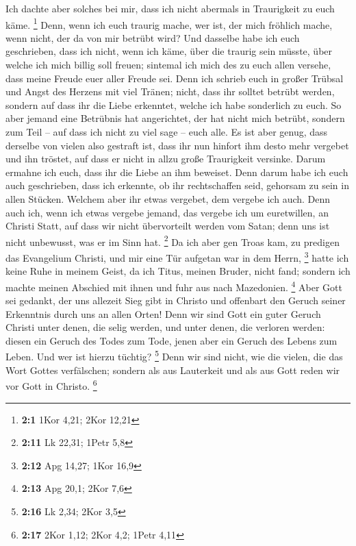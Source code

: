  Ich dachte aber solches bei mir, dass ich nicht abermals
in Traurigkeit zu euch käme. \footnote{\textbf{2:1} 1Kor 4,21; 2Kor
  12,21}  Denn, wenn ich euch traurig mache, wer ist, der
mich fröhlich mache, wenn nicht, der da von mir betrübt wird?
 Und dasselbe habe ich euch geschrieben, dass ich nicht,
wenn ich käme, über die traurig sein müsste, über welche ich mich billig
soll freuen; sintemal ich mich des zu euch allen versehe, dass meine
Freude euer aller Freude sei.  Denn ich schrieb euch in
großer Trübsal und Angst des Herzens mit viel Tränen; nicht, dass ihr
solltet betrübt werden, sondern auf dass ihr die Liebe erkenntet, welche
ich habe sonderlich zu euch.  So aber jemand eine
Betrübnis hat angerichtet, der hat nicht mich betrübt, sondern zum Teil
-- auf dass ich nicht zu viel sage -- euch alle.  Es ist
aber genug, dass derselbe von vielen also gestraft ist, 
dass ihr nun hinfort ihm desto mehr vergebet und ihn tröstet, auf dass
er nicht in allzu große Traurigkeit versinke.  Darum
ermahne ich euch, dass ihr die Liebe an ihm beweiset. 
Denn darum habe ich euch auch geschrieben, dass ich erkennte, ob ihr
rechtschaffen seid, gehorsam zu sein in allen Stücken. 
Welchem aber ihr etwas vergebet, dem vergebe ich auch. Denn auch ich,
wenn ich etwas vergebe jemand, das vergebe ich um euretwillen, an
Christi Statt,  auf dass wir nicht übervorteilt werden
vom Satan; denn uns ist nicht unbewusst, was er im Sinn hat. \footnote{\textbf{2:11}
  Lk 22,31; 1Petr 5,8}  Da ich aber gen Troas kam, zu
predigen das Evangelium Christi, und mir eine Tür aufgetan war in dem
Herrn, \footnote{\textbf{2:12} Apg 14,27; 1Kor 16,9} 
hatte ich keine Ruhe in meinem Geist, da ich Titus, meinen Bruder, nicht
fand; sondern ich machte meinen Abschied mit ihnen und fuhr aus nach
Mazedonien. \footnote{\textbf{2:13} Apg 20,1; 2Kor 7,6} 
Aber Gott sei gedankt, der uns allezeit Sieg gibt in Christo und
offenbart den Geruch seiner Erkenntnis durch uns an allen Orten!
 Denn wir sind Gott ein guter Geruch Christi unter denen,
die selig werden, und unter denen, die verloren werden: 
diesen ein Geruch des Todes zum Tode, jenen aber ein Geruch des Lebens
zum Leben. Und wer ist hierzu tüchtig? \footnote{\textbf{2:16} Lk 2,34;
  2Kor 3,5}  Denn wir sind nicht, wie die vielen, die das
Wort Gottes verfälschen; sondern als aus Lauterkeit und als aus Gott
reden wir vor Gott in Christo. \footnote{\textbf{2:17} 2Kor 1,12; 2Kor
  4,2; 1Petr 4,11}

